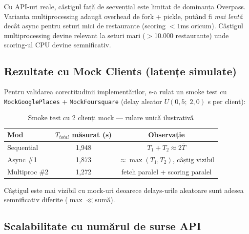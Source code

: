 \documentclass[12pt,a4paper]{article}
\newcommand{\thead}[1]{\cellcolor{tblh}\color{white}\textbf{#1}}
\begin{document}
\begin{notebox}[Interpretare]
Cu API-uri reale, câștigul față de secvențial este limitat de dominanța Overpass. Varianta multiprocessing adaugă overhead de fork + pickle, putând fi \textit{mai lentă} decât async pentru seturi mici de restaurante (scoring $<1$ms oricum). Câștigul multiprocessing devine relevant la seturi mari ($>$10.000 restaurante) unde scoring-ul CPU devine semnificativ.
\end{notebox}

\subsection{Rezultate cu Mock Clients (latențe simulate)}

Pentru validarea corectitudinii implementărilor, s-a rulat un smoke test cu \texttt{MockGooglePlaces} + \texttt{MockFoursquare} (delay aleator $U(0{,}5;\; 2{,}0)$ s per client):

\begin{table}[H]
\centering
\begin{tabular}{lcc}
\toprule
\thead{Mod} & \thead{$T_{total}$ măsurat (s)} & \thead{Observație} \\
\midrule
Sequential    & 1{,}948 & $T_1 + T_2 \approx 2\bar{T}$ \\
Async \#1     & 1{,}873 & $\approx \max(T_1, T_2)$, câștig vizibil \\
Multiproc \#2 & 1{,}272 & fetch paralel + scoring paralel \\
\bottomrule
\end{tabular}
\caption{Smoke test cu 2 clienți mock --- rulare unică ilustrativă}
\end{table}

Câștigul este mai vizibil cu mock-uri deoarece delays-urile aleatoare sunt adesea semnificativ diferite ($\max \ll \text{sumă}$).

\subsection{Scalabilitate cu numărul de surse API}
\end{document}
